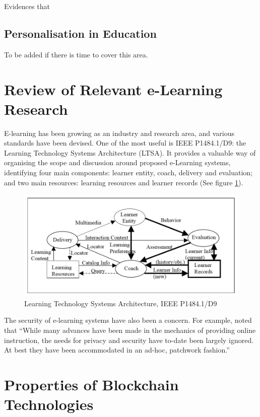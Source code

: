 Evidences that

\subsection{Personalisation in Education}

To be added if there is time to cover this area.

\section{Review of Relevant e-Learning Research}

E-learning has been growing as an industry and research area, and various standards have been devised. One of the most
useful is IEEE P1484.1/D9: the Learning Technology Systems Architecture (LTSA). It provides a valuable way of organising 
the scope and discussion around proposed e-Learning systems, identifying four main components: learner entity, coach, 
delivery and evaluation; and two main resources: learning resources and learner records (See figure \ref{fig:LTSA}).

\begin{figure}[!ht] 
    \centering    
    \includegraphics[width=1.0\textwidth]{LTSA}
    \caption[LTSA]{Learning Technology Systems Architecture, IEEE P1484.1/D9 \citep{farance1999learning}}
    \label{fig:LTSA}
\end{figure}

The security of e-learning systems have also been a concern. For example, \citet{el2003privacy} noted that “While many 
advances have been made in the mechanics of providing online instruction, the needs for privacy and security have to-date 
been largely ignored. At best they have been accommodated in an ad-hoc, patchwork fashion.”


\section{Properties of Blockchain Technologies}


